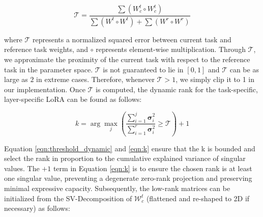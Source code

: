 \documentclass[10pt]{article} %
\begin{document}




\begin{equation}
\label{eqn:threshold_dynamic}
\mathcal{T} = \frac{\sum (W_c^t \circ W_c^t)}{\sum (W^t \circ W^t) + \sum (W^r \circ W^r)}
\end{equation}



where $\mathcal{T}$ represents a normalized squared error between current task and reference task weights, and $\circ$ represents element-wise multiplication. Through $\mathcal{T}$, we approximate the proximity of the current task with respect to the reference task in the parameter space. $\mathcal{T}$ is not guaranteed to lie in $[0,1]$ and $\mathcal{T}$ can be as large as $2$ in extreme cases. Therefore, whenever $\mathcal{T} > 1$, we simply clip it to 1 in our implementation. Once $\mathcal{T}$ is computed, the dynamic rank for the task-specific, layer-specific LoRA can be found as follows:

\begin{equation}
\label{eqn:k}
k = \arg\max_{j} \left( \frac{\sum_{i=1}^{j} \mathbf{\sigma}_i^2}{\sum_{i=1}^{r} \mathbf{\sigma}_i^2} \geq \mathcal{T} \right) + 1
\end{equation}

Equation \ref{eqn:threshold_dynamic} and \ref{eqn:k} ensure that the k is bounded and select the rank in proportion to the cumulative explained variance of singular values. The $+1$ term in Equation \ref{eqn:k} is to ensure the chosen rank is at least one singular value, preventing a degenerate zero-rank projection and preserving minimal expressive capacity.  Subsequently, the low-rank matrices can be initialized from the SV-Decomposition of $\mathcal{W}^{t}_{c}$ (flattened and re-shaped to 2D if necessary) as follows:
\end{document}
